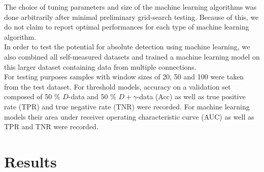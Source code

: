 \documentclass[12pt,a4paper,automark, toc=bib]{scrreprt}
\theoremstyle{definition}
\begin{document}
			The choice of tuning parameters and size of the machine learning algorithms was done arbitrarily after minimal preliminary grid-search testing. Because of this, we do not claim to report optimal performances for each type of machine learning algorithm. \\
			In order to test the potential for absolute detection using machine learning, we also combined all self-measured datasets and trained a machine learning model on this larger dataset containing data from multiple connections. \\
			For testing purposes samples with window sizes of 20, 50 and 100 were taken from the test dataset. For threshold models, accuracy on a validation set composed of 50 \% $D$-data and 50 \% $D + \gamma$-data (Acc) as well as true positive rate (TPR) and true negative rate (TNR) were recorded. For machine learning models their area under receiver operating characteristic curve (AUC) as well as TPR and TNR were recorded. 
		
		\section{Results}
			
\end{document}

